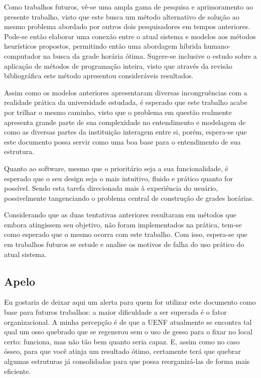 Como trabalhos futuros, vê-se uma ampla gama de pesquisa e aprimoramento ao presente trabalho, visto que este busca um método alternativo de solução ao mesmo problema abordado por outros dois pesquisadores em tempos anteriores. Pode-se então elaborar uma conexão entre o atual sistema e modelos aos métodos heurísticos propostos, permitindo então uma abordagem híbrida humano-computador na busca da grade horária ótima. Sugere-se inclusive o estudo sobre a aplicação de métodos de programação inteira, visto que através da revisão bibliográfica este método apresentou consideráveis resultados.

Assim como os modelos anteriores apresentaram diversas incongruências com a realidade prática da universidade estudada, é esperado que este trabalho acabe por trilhar o mesmo caminho, visto que o problema em questão realmente apresenta grande parte de sua complexidade no entendimento e modelagem de como as diversas partes da instituição interagem entre si, porém, espera-se que este documento possa servir como uma boa base para o entendimento de sua estrutura.

Quanto ao software, mesmo que o prioritário seja a sua funcionalidade, é esperado que o seu design seja o mais intuitivo, fluido e prático quanto for possível. Sendo esta tarefa direcionada mais à experiência do usuário, possivelmente tangenciando o problema central de construção de grades horárias.

Considerando que as duas tentativas anteriores resultaram em métodos que embora atingissem seu objetivo, não foram implementados na prática, tem-se como esperado que o mesmo ocorra com este trabalho. Com isso, espera-se que em trabalhos futuros se estude e analise os motivos de falha do uso prático do atual sistema.

\subsection*{Apelo}

Eu gostaria de deixar aqui um alerta para quem for utilizar este documento como base para futuros trabalhos: a maior dificuldade a ser superada é o fator organizacional. A minha percepção é de que a UENF atualmente se encontra tal qual um osso quebrado que se regenerou sem o uso de gesso para o fixar no local certo: funciona, mas não tão bem quanto seria capaz. E, assim como no caso ósseo, para que você atinja um resultado ótimo, certamente terá que quebrar algumas estruturas já consolidadas para que possa reorganizá-las de forma mais eficiente.

